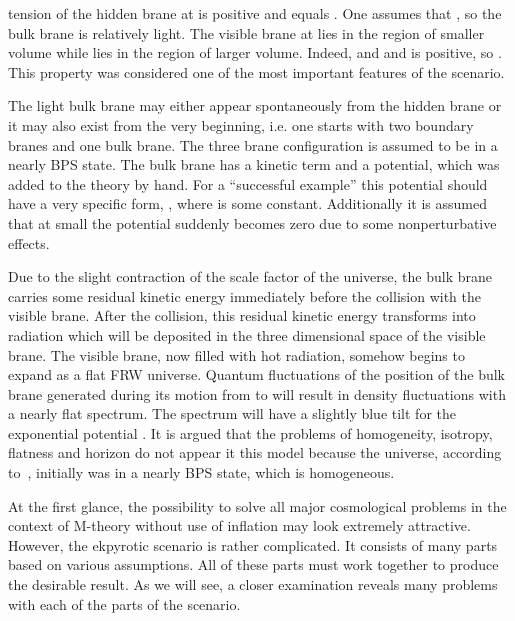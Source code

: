 \documentclass[a4paper,12pt]{article}
\begin{document}
tension of the hidden brane at \coordHE{} is  positive and equals
\myHighlight{$\alpha-\beta$}\coordHE{}. One assumes that \myHighlight{$\beta \ll \alpha$}\coordHE{}, so the bulk brane is
relatively light. The visible brane at \coordHE{} lies in the region of smaller
volume  while \coordHE{} lies in the region of larger volume. Indeed, \coordHE{}
and \coordHE{} and  \myHighlight{$\alpha$}\coordHE{} is positive, so \coordHE{}. This
property was considered one of the most important features of the scenario.

 
The light bulk brane may either appear spontaneously from the hidden brane
or it may also exist from the very beginning, i.e. one starts with two
boundary branes and one bulk brane. The three brane configuration is
assumed to be in a nearly BPS state. The
bulk brane has a kinetic term and a potential, which was added to the theory by hand. For a ``successful
example'' this potential should have a very specific form,  \coordHE{}, where \coordHE{} is some constant. Additionally  it is
assumed that at small \coordHE{} the potential suddenly becomes zero due to some
nonperturbative effects.

 Due to the slight contraction of the scale factor of the universe, the bulk  brane carries some residual kinetic energy
immediately before the collision with the visible brane. After the
collision, this residual kinetic energy transforms into radiation which
will be deposited in the three dimensional space of the visible  brane.
The visible brane, now filled with hot radiation, somehow begins to expand
as a flat FRW universe. 
Quantum fluctuations of the position of the bulk brane generated during
its  motion from \coordHE{} to \coordHE{}  will result in  density fluctuations
with a nearly flat spectrum.  The spectrum will have a slightly blue tilt
for the exponential potential \coordHE{}. It is argued that the problems of homogeneity, isotropy, flatness and horizon do not appear it this model because the universe, according to~\cite{KOST}, initially was in a nearly BPS state, which is homogeneous.

At the first glance, the possibility to solve all major cosmological problems in the context of M-theory without use of inflation may look extremely attractive. However, the ekpyrotic scenario is rather complicated. It consists of many parts based on various assumptions. All of these parts must work together to produce the desirable result. As we will see, a closer examination reveals many problems with each of the parts of the scenario.
\end{document}
